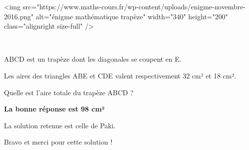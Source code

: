 
%
<img src="https://www.maths-cours.fr/wp-content/uploads/enigme-novembre-2016.png" alt="énigme mathématique trapèze" width="340" height="200" class="alignright size-full" />
\par
[Connaissances requises : à partir de la troisième]
\par
~
\par
ABCD est un trapèze dont les diagonales se coupent en E.
\par
Les aires des triangles ABE et CDE valent respectivement 32 cm² et 18 cm².
\par
Quelle est l'aire totale du trapèze ABCD ?
\begin{corrige}

     \textbf{La bonne réponse est 98 cm²}
\par
     La solution retenue est celle de Paki.
     \par
     Bravo et merci pour cette solution !
     \par
     [slider name=enigme-12-16]
     \par
     [pdf-embedder url="/wp-content/uploads/slides/enigme-12-16/1.pdf" width="676"]
\end{corrige}
